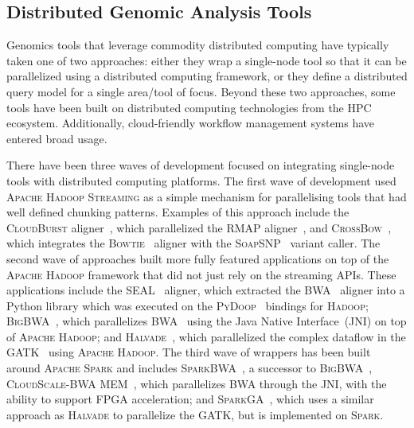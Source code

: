 \documentclass[phd]{ucbthesis}
\begin{document}
\subsection{Distributed Genomic Analysis Tools}
\label{sec:distributed-genome-analysis}

Genomics tools that leverage commodity distributed computing have typically
taken one of two approaches: either they wrap a single-node tool so that it can
be parallelized using a distributed computing framework, or they define a
distributed query model for a single area/tool of focus. Beyond these two
approaches, some tools have been built on distributed computing technologies
from the HPC ecosystem. Additionally, cloud-friendly workflow management
systems have entered broad usage.

There have been three waves of development focused on integrating single-node
tools with distributed computing platforms. The first wave of development used
\textsc{Apache Hadoop Streaming} as a simple mechanism for parallelising tools
that had well defined chunking patterns. Examples of this approach include the
\textsc{CloudBurst} aligner~\cite{schatz09}, which parallelized the
\textsc{RMAP} aligner~\cite{smith08}, and
\textsc{CrossBow}~\cite{langmead09crossbow}, which integrates the
\textsc{Bowtie}~\cite{langmead09bowtie} aligner with the
\textsc{SoapSNP}~\cite{li09snp} variant caller. The second wave of approaches
built more fully featured applications on top of the \textsc{Apache Hadoop}
framework that did not just rely on the streaming APIs. These applications
include the \textsc{SEAL}~\cite{pireddu11} aligner, which extracted the
\textsc{BWA}~\cite{li09} aligner into a Python library which was executed
on the \textsc{PyDoop}~\cite{leo10} bindings for \textsc{Hadoop};
\textsc{BigBWA}~\cite{abuin15}, which parallelizes \textsc{BWA}~\cite{li09}
using the Java Native Interface~(JNI) on top of \textsc{Apache Hadoop}; and
\textsc{Halvade}~\cite{decap15}, which parallelized the complex dataflow in
the \textsc{GATK}~\cite{depristo11} using \textsc{Apache Hadoop}. The third
wave of wrappers has been built around \textsc{Apache Spark} and includes
\textsc{SparkBWA}~\cite{abuin16}, a successor to \textsc{BigBWA}~\cite{abuin15},
\textsc{CloudScale-BWA MEM}~\cite{chen16}, which parallelizes
\textsc{BWA} through the JNI, with the ability to support \textsc{FPGA}
acceleration; and \textsc{SparkGA}~\cite{mushtaq17}, which uses a similar
approach as \textsc{Halvade} to parallelize the \textsc{GATK}, but is
implemented on \textsc{Spark}.
\end{document}
